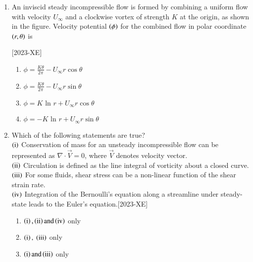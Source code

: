 \documentclass[journal]{IEEEtran}
\begin{document}
\begin{enumerate}[start=27]
\item An inviscid steady incompressible flow is formed by combining a uniform flow with velocity $U_{\infty}$ and a clockwise vortex of strength $K$ at the origin, as shown in the figure. Velocity potential $\left(\phi\right)$ for the combined flow in polar coordinate $\left(r, \theta\right)$ is 

    \hfill{[2023-XE]}\\
\begin{figure}[H]
			\centering
			
			\label{27}
		\end{figure}
\begin{enumerate}
    \item $\phi = \frac{K \theta}{2 \pi}-U_{\infty}r \cos \theta$\\
    \item $\phi = \frac{K \theta}{2 \pi}-U_{\infty}r \sin \theta$\\
    \item $\phi = K \text{ ln } r + U_{\infty}r \cos \theta$\\
    \item $\phi = -K \text{ ln } r + U_{\infty}r \sin \theta$\\
\end{enumerate}
\item Which of the following statements are true?\\
$\left(\text{i}\right)$ Conservation of mass for an unsteady incompressible flow can be represented as $\nabla \cdot \overset{\rightarrow}{V}=0$, where $\overset{\rightarrow}{V}$ denotes velocity vector.\\
$\left(\text{ii}\right)$ Circulation is defined as the line integral of vorticity about a closed curve.\\
$\left(\text{iii}\right)$ For some fluids, shear stress can be a non-linear function of the shear strain rate.\\
$\left(\text{iv}\right)$ Integration of the Bernoulli's equation along a streamline under steady-state leads to the Euler's equation.\hfill{[2023-XE]}\\
\begin{enumerate}
    \item $\left(\text{i}\right),\left(\text{ii}\right) \text{and} \left(\text{iv}\right)$ only
    \item $\left(\text{i}\right), $  $\left(\text{iii}\right)$ only
    \item $\left(\text{i}\right) \text{and} \left(\text{iii}\right)$ only

\end{enumerate}
\end{enumerate}
\end{document}
